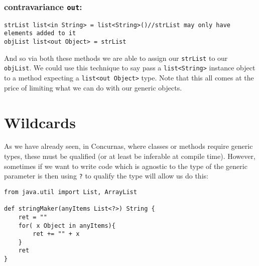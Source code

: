 \documentclass[conc-doc]{subfiles}
\begin{document}
\subsubsection{contravariance \lstinline!out!:}

\begin{lstlisting}
strList list<in String> = list<String>()//strList may only have elements added to it 
objList list<out Object> = strList
\end{lstlisting}
	
And so via both these methods we are able to assign our \lstinline{strList} to our \lstinline{objList}. We could use this technique to say pass a \lstinline{list<String>} instance object to a method expecting a \lstinline{list<out Object>} type. Note that this all comes at the price of limiting what we can do with our generic objects.

\section{Wildcards}
As we have already seen, in Concurnas, where classes or methods require generic types, these must be qualified (or at least be inferable at compile time). However, sometimes if we want to write code which is agnostic to the type of the generic parameter is then using \lstinline{?} to qualify the type will allow us do this:
\begin{lstlisting}
from java.util import List, ArrayList

def stringMaker(anyItems List<?>) String {
	ret = ""
	for( x Object in anyItems){
		ret += "" + x
	}
	ret
}
\end{lstlisting}
\end{document}
